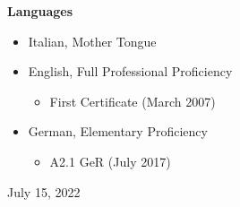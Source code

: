\documentclass[11pt]{article}
\begin{document}

\vspace*{2.5ex}
\noindent
{\Large\bf Languages}

\begin{itemize}
\item Italian, Mother Tongue
\item English, Full Professional Proficiency
\begin{itemize}
  \item First Certificate (March 2007)
\end{itemize}
\item German, Elementary Proficiency
\begin{itemize}
  \item A2.1 GeR (July 2017)
\end{itemize}
\end{itemize}


\vspace*{4ex}
\noindent
July 15, 2022

\end{document}
